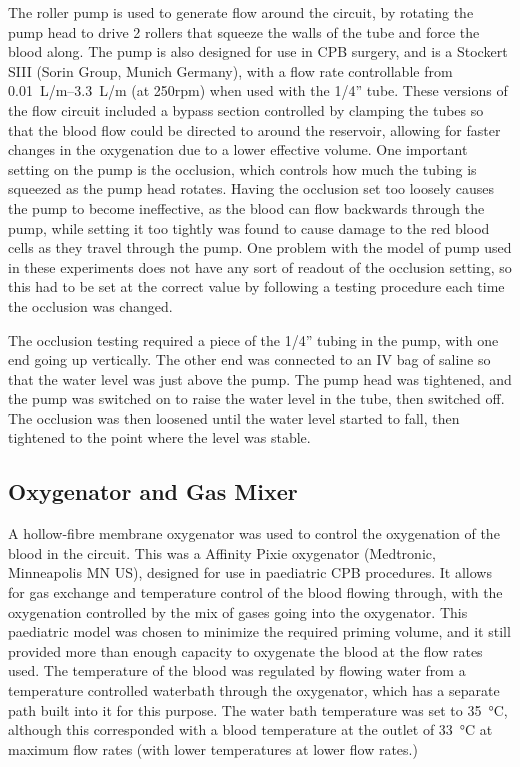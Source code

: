 The roller pump is used to generate flow around the circuit, by rotating the pump head to drive 2 rollers that squeeze the walls of the tube and force the blood along.
The pump is also designed for use in CPB surgery, and is a Stockert SIII (Sorin Group, Munich Germany), with a flow rate controllable from \SIrange{0.01}{3.3}{L/m} (at 250rpm) when used with the 1/4'' tube.
These versions of the flow circuit included a bypass section controlled by clamping the tubes so that the blood flow could be directed to around the reservoir, allowing for faster changes in the oxygenation due to a lower effective volume.
One important setting on the pump is the occlusion, which controls how much the tubing is squeezed as the pump head rotates.
Having the occlusion set too loosely causes the pump to become ineffective, as the blood can flow backwards through the pump, while setting it too tightly was found to cause damage to the red blood cells as they travel through the pump.
One problem with the model of pump used in these experiments does not have any sort of readout of the occlusion setting, so this had to be set at the correct value by following a testing procedure each time the occlusion was changed.

The occlusion testing required a piece of the 1/4'' tubing in the pump, with one end going up vertically.
The other end was connected to an IV bag of saline so that the water level was just above the pump.
The pump head was tightened, and the pump was switched on to raise the water level in the tube, then switched off.
The occlusion was then loosened until the water level started to fall, then tightened to the point where the level was stable.

\subsection{Oxygenator and Gas Mixer}
A hollow-fibre membrane oxygenator was used to control the oxygenation of the blood in the circuit.
This was a Affinity Pixie oxygenator (Medtronic, Minneapolis MN US), designed for use in paediatric CPB procedures.
It allows for gas exchange and temperature control of the blood flowing through, with the oxygenation controlled by the mix of gases going into the oxygenator.
This paediatric model was chosen to minimize the required priming volume, and it still provided more than enough capacity to oxygenate the blood at the flow rates used.
The temperature of the blood was regulated by flowing water from a temperature controlled waterbath through the oxygenator, which has a separate path built into it for this purpose.
The water bath temperature was set to \SI{35}{\degreeCelsius}, although this corresponded with a blood temperature at the outlet of \SI{33}{\degreeCelsius} at maximum flow rates (with lower temperatures at lower flow rates.)

